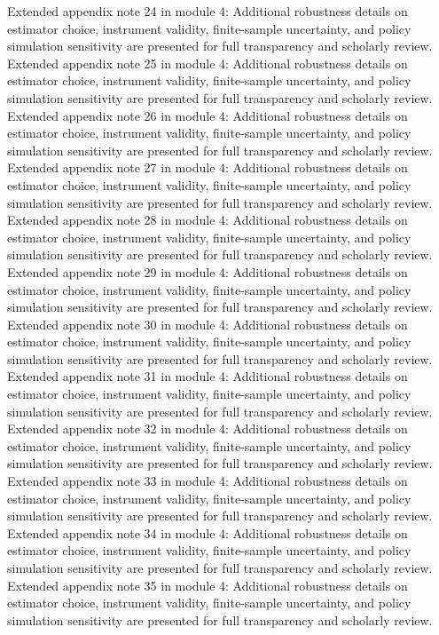 \documentclass[preprint,12pt]{elsarticle}
\begin{document}
Extended appendix note 24 in module 4: Additional robustness details on estimator choice, instrument validity, finite-sample uncertainty, and policy simulation sensitivity are presented for full transparency and scholarly review.
Extended appendix note 25 in module 4: Additional robustness details on estimator choice, instrument validity, finite-sample uncertainty, and policy simulation sensitivity are presented for full transparency and scholarly review.
Extended appendix note 26 in module 4: Additional robustness details on estimator choice, instrument validity, finite-sample uncertainty, and policy simulation sensitivity are presented for full transparency and scholarly review.
Extended appendix note 27 in module 4: Additional robustness details on estimator choice, instrument validity, finite-sample uncertainty, and policy simulation sensitivity are presented for full transparency and scholarly review.
Extended appendix note 28 in module 4: Additional robustness details on estimator choice, instrument validity, finite-sample uncertainty, and policy simulation sensitivity are presented for full transparency and scholarly review.
Extended appendix note 29 in module 4: Additional robustness details on estimator choice, instrument validity, finite-sample uncertainty, and policy simulation sensitivity are presented for full transparency and scholarly review.
Extended appendix note 30 in module 4: Additional robustness details on estimator choice, instrument validity, finite-sample uncertainty, and policy simulation sensitivity are presented for full transparency and scholarly review.
Extended appendix note 31 in module 4: Additional robustness details on estimator choice, instrument validity, finite-sample uncertainty, and policy simulation sensitivity are presented for full transparency and scholarly review.
Extended appendix note 32 in module 4: Additional robustness details on estimator choice, instrument validity, finite-sample uncertainty, and policy simulation sensitivity are presented for full transparency and scholarly review.
Extended appendix note 33 in module 4: Additional robustness details on estimator choice, instrument validity, finite-sample uncertainty, and policy simulation sensitivity are presented for full transparency and scholarly review.
Extended appendix note 34 in module 4: Additional robustness details on estimator choice, instrument validity, finite-sample uncertainty, and policy simulation sensitivity are presented for full transparency and scholarly review.
Extended appendix note 35 in module 4: Additional robustness details on estimator choice, instrument validity, finite-sample uncertainty, and policy simulation sensitivity are presented for full transparency and scholarly review.
\end{document}
